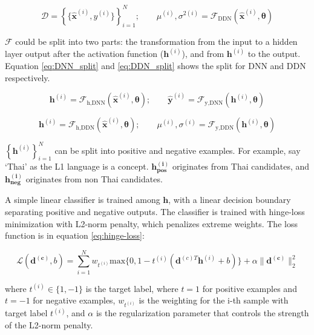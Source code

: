 \begin{equation} \label{eq:DDN}
    \mathcal{D} = \left\{\{\mathbf{\hat{x}}^{(i)},y^{(i)}\}\right\}_{i=1}^{N}; \qquad \mu^{(i)}, \sigma^{2(i)} = \mathcal{F}_{\text{DDN}}(\mathbf{\hat{x}}^{(i)}, \boldsymbol{\theta})
\end{equation}

$\mathcal{F}$ could be split into two parts: the transformation from the input to a hidden layer output after the activation function ($\mathbf{h}^{(i)}$), and from $\mathbf{h}^{(i)}$ to the output. Equation \ref{eq:DNN_split} and \ref{eq:DDN_split} shows the split for DNN and DDN respectively.

\begin{equation} \label{eq:DNN_split}
    \mathbf{h}^{(i)} = \mathcal{F}_{\text{h,DNN}}(\mathbf{\hat{x}}^{(i)}, \boldsymbol{\theta}); \qquad \mathbf{\hat{y}}^{(i)} = \mathcal{F}_{\text{y,DNN}}(\mathbf{h}^{(i)}, \boldsymbol{\theta})
\end{equation}

\begin{equation} \label{eq:DDN_split}
    \mathbf{h}^{(i)} = \mathcal{F}_{\text{h,DDN}}(\mathbf{\hat{x}}^{(i)}, \boldsymbol{\theta}); \qquad \mu^{(i)}, \sigma^{(i)} = \mathcal{F}_{\text{y,DDN}}(\mathbf{h}^{(i)}, \boldsymbol{\theta})
\end{equation}

$\left\{ \mathbf{h}^{(i)} \right\}_{i=1}^N$ can be split into positive and negative examples. For example, say `Thai' as the L1 language is a concept. $\boldsymbol{h_{pos}^{(i)}}$ originates from Thai candidates, and $\boldsymbol{h_{neg}^{(i)}}$ originates from non Thai candidates.

A simple linear classifier is trained among $\boldsymbol{h}$, with a linear decision boundary separating positive and negative outputs. The classifier is trained with hinge-loss minimization with L2-norm penalty, which penalizes extreme weights. The loss function is in equation \ref{eq:hinge-loss}:

\begin{equation} \label{eq:hinge-loss}
    \mathcal{L}(\boldsymbol{d^{(c)}}, b) = \sum_{i=1}^{N} w_{t^(i)} \mathrm{max} \{0, 1 - t^{(i)}(\boldsymbol{d}^{(c)T}\boldsymbol{h}^{(i)} + b)\} + \alpha \|\boldsymbol{d^{(c)}}\|_2^2
\end{equation}

where $t^{(i)} \in \{1, -1\}$ is the target label, where $t = 1$ for positive examples and $t = -1$ for negative examples, $w_{t^{(i)}}$ is the weighting for the i-th sample with target label $t^{(i)}$, and $\alpha$ is the regularization parameter that controls the strength of the L2-norm penalty.

